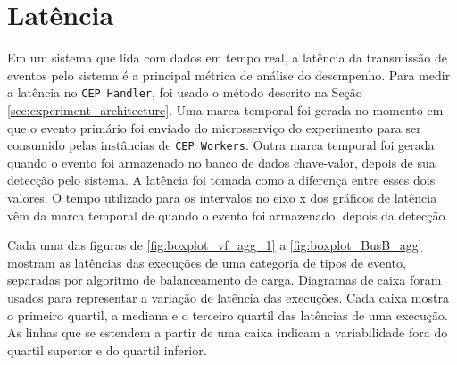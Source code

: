 \newpage
\section{Latência}
\label{sec:latency}







Em um sistema que lida com dados em tempo real, a latência da transmissão de eventos pelo sistema é a principal métrica de análise do desempenho. Para medir a latência no \texttt{CEP Handler}, foi usado o método descrito na Seção  \ref{sec:experiment_architecture}. Uma marca temporal foi gerada no momento em que o evento primário foi enviado do microsserviço do experimento para ser consumido pelas instâncias de \texttt{CEP Workers}. Outra marca temporal foi gerada quando o evento foi armazenado no banco de dados chave-valor, depois de sua detecção pelo sistema. A latência foi tomada como a diferença entre esses dois valores. O tempo utilizado para os intervalos no eixo x dos gráficos de latência vêm da marca temporal de quando o evento foi armazenado, depois da detecção. 

Cada uma das figuras de \ref{fig:boxplot_vf_agg_1} a \ref{fig:boxplot_BusB_agg} mostram as latências das execuções de uma categoria de tipos de evento, separadas por algoritmo de balanceamento de carga. Diagramas de caixa foram usados para representar a variação de latência das execuções. Cada caixa mostra o primeiro quartil, a mediana e o terceiro quartil das latências de uma execução.  As linhas que se estendem a partir de uma caixa indicam a variabilidade fora do quartil superior e do quartil inferior.  %


